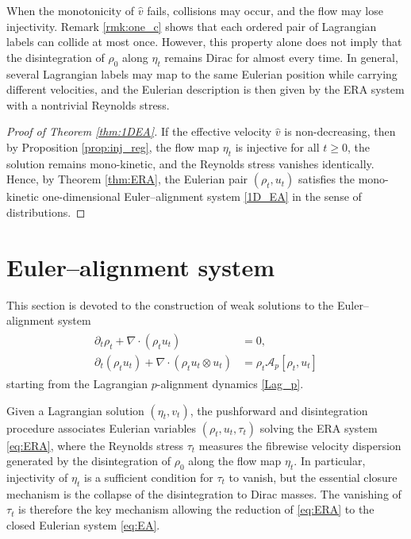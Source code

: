 \documentclass[10pt,reqno]{amsart}
\renewcommand{\ge}{\geqslant}
\numberwithin{equation}{section}
\newcommand{\pa}{\partial}
\newcommand{\calA}{\mathcal A}
\begin{document}
When the monotonicity of $\widehat v$ fails, collisions may occur, and the flow may lose injectivity. Remark \ref{rmk:one_c} shows that each ordered pair of Lagrangian labels can collide at most once. However, this property alone does not imply that the disintegration of $\rho_0$ along $\eta_t$ remains Dirac for almost every time. In general, several Lagrangian labels may map to the same Eulerian position while carrying different velocities, and the Eulerian description is then given by the ERA system with a nontrivial Reynolds stress.
 
\begin{proof}[Proof of Theorem \ref{thm:1DEA}]
If the effective velocity $\widehat v$ is non-decreasing, then by Proposition \ref{prop:inj_reg}, the flow map $\eta_t$ is injective for all $t\ge0$, the solution remains mono-kinetic, and the
Reynolds stress vanishes identically. Hence, by Theorem \ref{thm:ERA}, the Eulerian pair $(\rho_t,u_t)$ satisfies the mono-kinetic one-dimensional Euler--alignment system \eqref{1D_EA} in the sense of distributions.
\end{proof}




     
 
%
%
%                      
%
%
 

\section{Euler--alignment system}\label{sec:EA}

This section is devoted to the construction of weak solutions to the Euler--alignment system
\begin{align}\label{eq:EA}
\begin{aligned}
\pa_t\rho_t+\nabla \cdot(\rho_t u_t)&=0, \\
\pa_t(\rho_t u_t)+\nabla \cdot(\rho_t u_t\otimes u_t)
&=\rho_t \calA_p[\rho_t,u_t]
\end{aligned}
\end{align}
starting from the Lagrangian $p$-alignment dynamics \eqref{Lag_p}.

Given a Lagrangian solution $(\eta_t,v_t)$, the pushforward and disintegration procedure associates Eulerian variables $(\rho_t,u_t,\tau_t)$ solving the ERA system \eqref{eq:ERA}, where the Reynolds stress $\tau_t$ measures the fibrewise velocity dispersion generated by the disintegration of $\rho_0$ along the flow map $\eta_t$. In particular, injectivity of $\eta_t$ is a sufficient condition for $\tau_t$ to vanish, but the essential closure mechanism is the collapse of the disintegration to Dirac masses. The vanishing of $\tau_t$ is therefore the key mechanism allowing the reduction of \eqref{eq:ERA} to the closed Eulerian system \eqref{eq:EA}.
\end{document}
